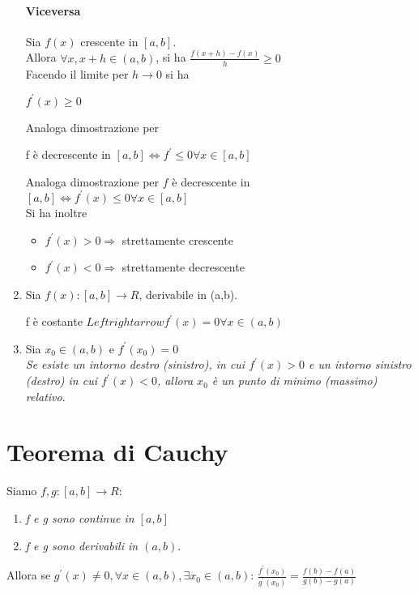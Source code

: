 \documentclass{book}
\begin{document}
\begin{enumerate}
		\paragraph{Viceversa} Sia $f(x)$ crescente in $[a,b]$.\\
		Allora $\forall x, x+h\in (a,b)$, si ha $\frac{f(x+h)-f(x)}{h}\geq 0$\\
		Facendo il limite per $h\to 0$ si ha
		\begin{center}
			$f^\prime(x)\geq 0$
		\end{center}
		Analoga dimostrazione per
		\begin{center}
			f è decrescente in $[a,b]\Leftrightarrow f^\prime\leq 0 \forall
			x\in [a,b]$
		\end{center}
		Analoga dimostrazione per $f$ è decrescente in $[a,b]\Leftrightarrow
		f^\prime(x)\leq 0 \forall x \in [a,b]$\\
		Si ha inoltre
		\begin{itemize}
			\item $f^\prime (x)>0\Rightarrow$ strettamente crescente
			\item $f^\prime (x)<0\Rightarrow$ strettamente decrescente
		\end{itemize}
	\item Sia $f(x):[a,b]\to R$, derivabile in (a,b).
		\begin{center}
			f è costante $Leftrightarrow f^\prime (x)=0 \forall x\in(a,b)$
		\end{center}
	\item Sia $x_0\in (a,b)$ e $f^\prime (x_0)=0$\\
		\textit{Se esiste un intorno destro (sinistro), in cui $f^\prime (x)>0$
		e un intorno sinistro (destro) in cui $f^\prime (x)<0$, allora $x_0$ è
		un punto di minimo (massimo) relativo}.
\end{enumerate}
\section{Teorema di Cauchy}
Siamo $f,g:[a,b]\to R$:
\begin{enumerate}
	\item \textit{f e g sono continue in $[a,b]$}
	\item \textit{f e g sono derivabili in $(a,b)$}.
\end{enumerate}
Allora se $g^\prime (x) \neq 0, \forall x \in (a,b), \exists x_0\in(a,b)$:
$\frac{f^\prime (x_0)}{g^\prime (x_0)}=\frac{f(b)-f(a)}{g(b)-g(a)}$
\end{document}
